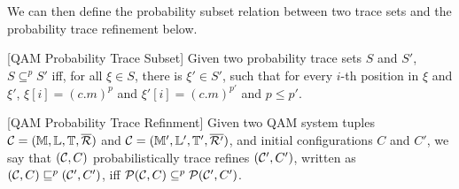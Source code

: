 We can then define the probability subset relation between two trace sets and the probability trace refinement below.

\begin{definition}\label{def:ptracesub}\rm[QAM Probability Trace Subset]
Given two probability trace sets $S$ and $S'$, $S \subseteq^p S'$ iff, for all $\xi \in S$, there is $\xi' \in S'$, such that for every $i$-th position in $\xi$ and $\xi'$, $\xi[i]=(c.m)^p$ and $\xi'[i]=(c.m)^{p'}$ and $p \le p'$.

\end{definition}

\begin{definition}\label{def:ptracerefine}\rm[QAM Probability Trace Refinment]
Given two QAM system tuples $\mathcal{C}=(\mathbb{M},\mathbb{L},\mathbb{T},\overline{\mathcal{R}})$ and $\mathcal{C}=(\mathbb{M}',\mathbb{L}',\mathbb{T}',\overline{\mathcal{R}'})$, and initial configurations $C$ and $C'$,  we say that $(\mathcal{C},C)$ probabilistically trace refines $(\mathcal{C}',C')$, written as $(\mathcal{C},C) \sqsubseteq^p (\mathcal{C}',C')$, iff $\mathcal{P}(\mathcal{C},C)\subseteq^p \mathcal{P}(\mathcal{C}',C')$.

\end{definition}




